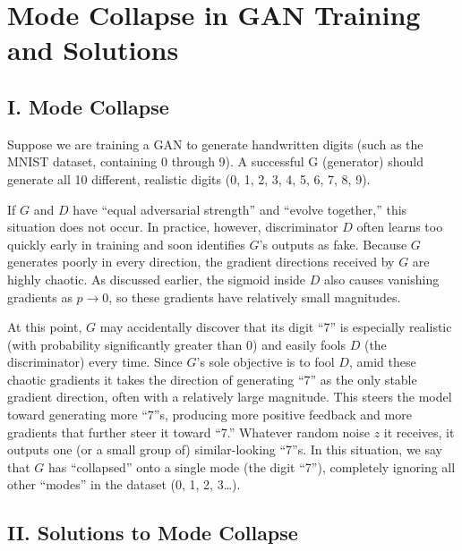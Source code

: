 \setcounter{section}{1}

\hypertarget{mode-collapse-in-gan-training-and-solutions}{%
\section{Mode Collapse in GAN Training and Solutions}\label{mode-collapse-in-gan-training-and-solutions}}

\hypertarget{i.-mode-collapse}{%
\subsection{I. Mode Collapse}\label{i.-mode-collapse}}

Suppose we are training a GAN to generate handwritten digits (such as the MNIST dataset, containing 0 through 9). A successful G (generator) should generate all 10 different, realistic digits (0, 1, 2, 3, 4, 5, 6, 7, 8, 9).

If \(G\) and \(D\) have ``equal adversarial strength'' and ``evolve together,'' this situation does not occur. In practice, however, discriminator \(D\) often learns too quickly early in training and soon identifies \(G\)'s outputs as fake. Because \(G\) generates poorly in every direction, the gradient directions received by \(G\) are highly chaotic. As discussed earlier, the sigmoid inside \(D\) also causes vanishing gradients as \(p \to 0\), so these gradients have relatively small magnitudes.

At this point, \(G\) may accidentally discover that its digit ``7'' is especially realistic (with probability significantly greater than \(0\)) and easily fools \(D\) (the discriminator) every time. Since \(G\)'s sole objective is to fool \(D\), amid these chaotic gradients it takes the direction of generating ``7'' as the only stable gradient direction, often with a relatively large magnitude. This steers the model toward generating more ``7''s, producing more positive feedback and more gradients that further steer it toward ``7.'' Whatever random noise \(z\) it receives, it outputs one (or a small group of) similar-looking ``7''s. In this situation, we say that \(G\) has ``collapsed'' onto a single mode (the digit ``7''), completely ignoring all other ``modes'' in the dataset (0, 1, 2, 3\ldots).

\hypertarget{ii.-solutions-to-mode-collapse}{%
\subsection{II. Solutions to Mode Collapse}\label{ii.-solutions-to-mode-collapse}}

